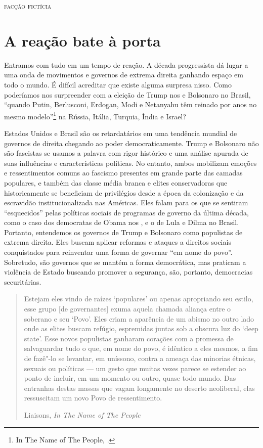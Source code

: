 
\hfill{}\textsc{facção fictícia}

\bigskip

\section{A reação bate à porta}

Entramos com tudo em um tempo de reação. A década progressista dá lugar a uma onda de movimentos e governos de extrema direita ganhando espaço em todo o mundo. É difícil acreditar que existe alguma surpresa nisso. Como poderíamos nos surpreender com a eleição de Trump nos  e Bolsonaro no Brasil, ``quando Putin, Berlusconi, Erdogan, Modi e Netanyahu têm reinado por anos no mesmo modelo''\footnote{In The Name of The People, .} na Rússia, Itália, Turquia, Índia e Israel?

Estados Unidos e Brasil são os retardatários em uma tendência mundial de governos de direita chegando ao poder democraticamente. Trump e Bolsonaro não são fascistas se usamos a palavra com rigor histórico e uma análise apurada de suas influências e características políticas. No entanto, ambos mobilizam emoções e ressentimentos comuns ao fascismo presentes em grande parte das camadas populares, e também das classe média branca e elites conservadoras que historicamente se beneficiam de privilégios desde a época da colonização e da escravidão institucionalizada nas Américas. Eles falam para os que se sentiram ``esquecidos'' pelas políticas sociais de programas de governo da última década, como o caso dos democratas de Obama nos , e o  de Lula e Dilma no Brasil. Portanto, entendemos os governos de Trump e Bolsonaro como populistas de extrema direita. Eles buscam aplicar reformas e ataques a direitos sociais conquistados para reinventar uma forma de governar ``em nome do povo''. Sobretudo, são governos que se mantém a forma democrática, mas praticam a violência de Estado buscando promover a segurança, são, portanto, democracias securitárias.

\begin{quote}
Estejam eles vindo de raízes `populares' ou apenas apropriando seu estilo, esse grupo [de governantes] exuma aquela chamada aliança entre o soberano e seu `Povo'. Eles criam a aparência de um abismo no outro lado onde as elites buscam refúgio, espremidas juntas sob a obscura luz do `deep state'. Esse novos populistas ganharam corações com a promessa de salvaguardar tudo o que, em nome do povo, é idêntico a eles mesmos, a fim de fazê"-lo se levantar, em uníssono, contra a ameaça das minorias étnicas, sexuais ou políticas --- um gesto que muitas vezes parece se estender ao ponto de incluir, em um momento ou outro, quase todo mundo. Das entranhas destas massas que vagam longamente no deserto neoliberal, elas ressuscitam um novo Povo de ressentimento.

Liaisons, \emph{In The Name of The People}
\end{quote}

